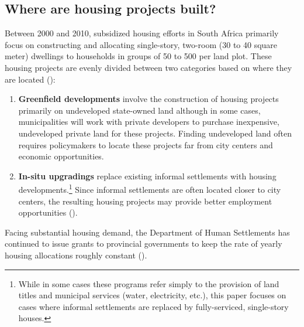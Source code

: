 \documentclass[12pt]{article}
\begin{document}














\subsection{Where are housing projects built?}

Between 2000 and 2010, subsidized housing efforts in South Africa primarily focus on constructing and allocating single-story, two-room (30 to 40 square meter) dwellings to households in groups of 50 to 500 per land plot.  These housing projects are evenly divided between two categories based on where they are located (\cite{dhsreports}):
\begin{enumerate}
	\item  \textbf{Greenfield developments} involve the construction of housing projects primarily on undeveloped state-owned land although in some cases, municipalities will work with private developers to purchase inexpensive, undeveloped private land for these projects.  Finding undeveloped land often requires policymakers to locate these projects far from city centers and economic opportunities.
	\item  \textbf{In-situ upgradings} replace existing informal settlements with housing developments.\footnote{While in some cases these programs refer simply to the provision of land titles and municipal services (water, electricity, etc.), this paper focuses on cases where informal settlements are replaced by fully-serviced, single-story houses.}  Since informal settlements are often located closer to city centers, the resulting housing projects may provide better employment opportunities (\cite{serihistory}).
\end{enumerate}
Facing substantial housing demand, the Department of Human Settlements has continued to issue grants to provincial governments to keep the rate of yearly housing allocations roughly constant (\cite{dhsreports}).
\end{document}
